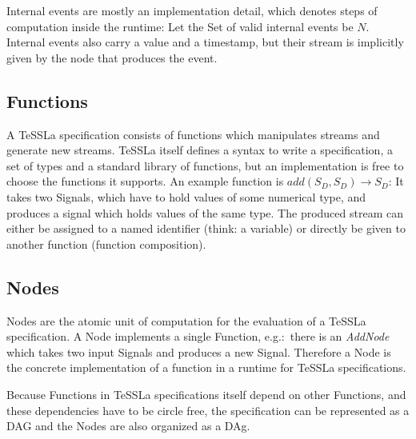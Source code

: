 Internal events are mostly an implementation detail, which denotes steps of computation inside the runtime:
Let the Set of valid internal events be \(N\).
Internal events also carry a value and a timestamp, but their stream is implicitly given by the node that produces the event.

\subsection{Functions}
\label{sec:system:defs:functions}

A TeSSLa specification consists of functions which manipulates streams and generate new streams.
TeSSLa itself defines a syntax to write a specification, a set of types and a standard library of functions, but an implementation is free to choose the functions it supports.
An example function is \(add(S_D,S_D) \rightarrow S_D\): It takes two Signals, which have to hold values of some numerical type, and produces a signal which holds values of the same type.
The produced stream can either be assigned to a named identifier (think: a variable) or directly be given to another function (function composition).

\subsection{Nodes}
\label{sec:system:defs:nodes}

Nodes are the atomic unit of computation for the evaluation of a TeSSLa specification.
A Node implements a single Function, e.g.:\ there is an \emph{AddNode} which takes two input Signals and produces a new Signal.
Therefore a Node is the concrete implementation of a function in a runtime for TeSSLa specifications.

Because Functions in TeSSLa specifications itself depend on other Functions, and these dependencies have to be circle free,
the specification can be represented as a DAG and the Nodes are also organized as a DAg.


